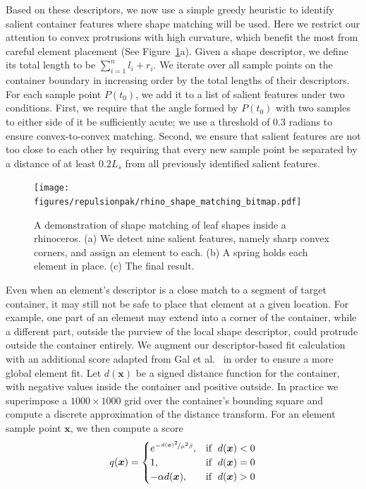 Based on these descriptors, we now use a simple greedy heuristic to identify salient container features where shape matching will be used.
Here we restrict our attention to convex protrusions with high curvature, which benefit the most from careful element placement (See Figure~\ref{rhino_packing}a).  Given a shape descriptor, we define its total length to be $\sum_{i=1}^nl_i+r_i$.  We iterate over all sample points on the container boundary in increasing order by the total lengths of their descriptors.  For each sample point $P(t_0)$, we add it to a list of salient features under two conditions. First, we require that the angle formed by $P(t_0)$ with two samples to either side of it be sufficiently acute; we use a threshold of 0.3 radians to ensure convex-to-convex matching.
Second, we ensure that salient features are not too close to each other by requiring that every new sample point be separated by a distance of at least $0.2L_s$ from all previously identified salient features.

\begin{figure}[t]
\centering
\texttt{[image: figures/repulsionpak/rhino\_shape\_matching\_bitmap.pdf]} 
\caption[A demonstration of shape matching to place elements]
{\label{rhino_packing}
{ 
A demonstration of shape matching of leaf shapes inside a rhinoceros. 
(a) We detect nine salient features, namely sharp convex corners, and 
assign an element to each.
(b) A spring holds each element in place.
(c) The final result.
}
}
\end{figure}

Even when an element's descriptor is a close match to a segment of 
target container, 
it may still not be safe to place that element at a given location.
For example, one part of an element may extend into a corner of the container,
while a different part, outside the purview of the local shape descriptor,
could protrude outside the container entirely.  We augment our 
descriptor-based fit calculation with an additional score adapted from
Gal et al.~\cite{Gal2007B} in order to ensure a more global element fit.
Let $d(\bm{x})$ be a signed distance function for the container, with
negative values inside the container and positive outside.  In practice we
superimpose a $1000\times 1000$ grid over the container's bounding square and
compute a discrete approximation of the distance transform.  For an element
sample point $\bm{x}$, we then compute a score
\begin{equation}
 q(\bm{x}) =\begin{cases}    
    e^{-\nicefrac{d(\bm{x})^2}{\mu^2\beta}}, & \mathrm{if} \;\; d(\bm{x}) < 0 \\
    1, & \mathrm{if} \;\;d(\bm{x}) = 0 \\
    - \alpha d(\bm{x}), & \mathrm{if}\;\; d(\bm{x}) > 0    
  \end{cases}
\end{equation}

